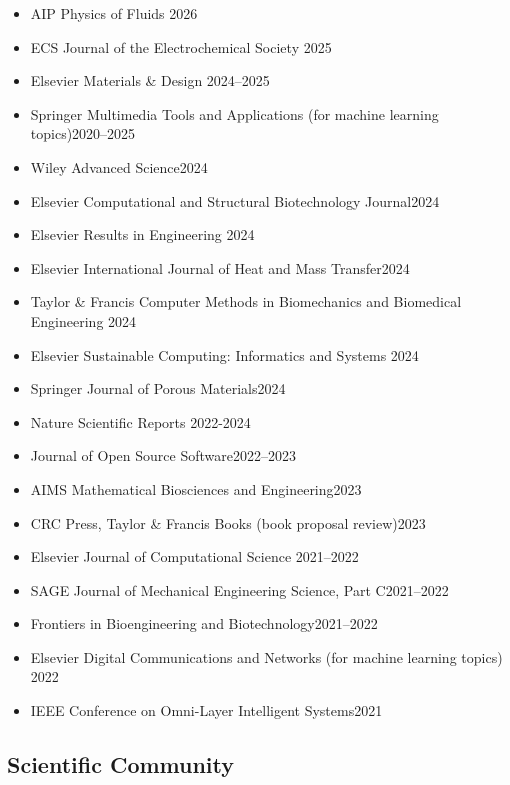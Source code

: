 \documentclass{cv}
\begin{document}
\begin{itemize}[itemsep=-0.2ex]
\item
AIP Physics of Fluids \hfill 2026
\item
ECS Journal of the Electrochemical Society \hfill 2025
\item
Elsevier Materials \& Design \hfill 2024--2025
\item
Springer Multimedia Tools and Applications (for machine learning topics)\hfill 2020--2025
\item
Wiley Advanced Science\hfill 2024
\item
Elsevier Computational and Structural Biotechnology Journal\hfill 2024
\item
Elsevier Results in Engineering \hfill 2024
\item
Elsevier International Journal of Heat and Mass Transfer\hfill 2024
\item
Taylor \& Francis Computer Methods in Biomechanics and Biomedical Engineering  \hfill 2024
\item
Elsevier Sustainable Computing: Informatics and Systems  \hfill 2024
\item
Springer Journal of Porous Materials\hfill 2024
\item
Nature Scientific Reports \hfill 2022-2024
\item
Journal of Open Source Software\hfill 2022--2023
\item
AIMS Mathematical Biosciences and Engineering\hfill 2023
\item
CRC Press, Taylor \& Francis Books (book proposal review)\hfill 2023
\item
Elsevier Journal of Computational Science \hfill 2021--2022
\item
SAGE Journal of Mechanical Engineering Science, Part C\hfill 2021--2022
\item
Frontiers in Bioengineering and Biotechnology\hfill 2021--2022
\item
Elsevier Digital Communications and Networks (for machine learning topics) \hfill 2022
\item
IEEE Conference on Omni-Layer Intelligent Systems\hfill 2021
\end{itemize}

\subsection{Scientific Community}
\end{document}
